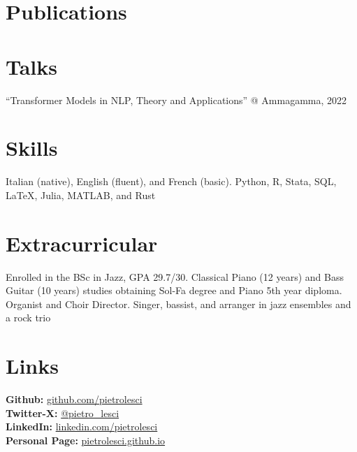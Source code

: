 \documentclass[]{cv_template}
\begin{document}
\begin{minipage}[t]{0.335\textwidth}

\section{Publications}
\vspace{1.8\topsep}


\nocite{*}


\vspace{-4pt}
\section{Talks}
\enquote{Transformer Models in NLP, Theory and Applications} @ Ammagamma, 2022
\rightsectionsep





\section{Skills}
Italian (native), English (fluent), and French (basic). Python, R, Stata, SQL, \LaTeX, Julia, MATLAB, and Rust
\rightsectionsep



\section{Extracurricular}
Enrolled in the BSc in Jazz, GPA 29.7/30. Classical Piano (12 years) and Bass Guitar (10 years) studies obtaining Sol-Fa degree and Piano 5th year diploma. Organist and Choir Director. Singer, bassist, and arranger in jazz ensembles and a rock trio
\rightsectionsep



\section{Links}
\textbf{Github:} \href{https://github.com/pietrolesci}{github.com/pietrolesci}\\
\textbf{Twitter-X:} \href{https://twitter.com/pietro_lesci}{@pietro\_lesci}\\
\textbf{LinkedIn:} \href{https://www.linkedin.com/in/pietrolesci}{linkedin.com/pietrolesci} \\
\textbf{Personal Page:} \href{https://pietrolesci.github.io}{pietrolesci.github.io}



\end{minipage}
\end{document}
